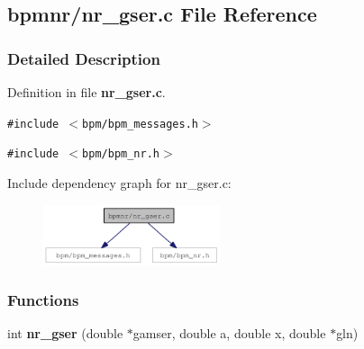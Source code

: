 \subsection{bpmnr/nr\_\-gser.c File Reference}
\label{nr__gser_8c}


\subsubsection{Detailed Description}


Definition in file {\bf nr\_\-gser.c}.

{\tt \#include $<$bpm/bpm\_\-messages.h$>$}\par
{\tt \#include $<$bpm/bpm\_\-nr.h$>$}\par


Include dependency graph for nr\_\-gser.c:\nopagebreak
\begin{figure}[H]
\begin{center}
\leavevmode
\includegraphics[width=147pt]{nr__gser_8c__incl}
\end{center}
\end{figure}
\subsubsection*{Functions}
\begin{CompactItemize}
\item 
int {\bf nr\_\-gser} (double $\ast$gamser, double a, double x, double $\ast$gln)
\end{CompactItemize}
